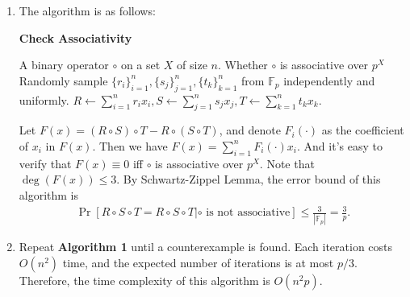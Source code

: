\begin{answer}
	\begin{enumerate}[label=\alph*).]
		\item The algorithm is as follows:
		\begin{algo}
			\caption{\textbf{Check Associativity}}
			\begin{algorithmic}[1]
				\Require A binary operator $\circ$ on a set $X$ of size $n$.
				\Ensure Whether $\circ$ is associative over $p^X$
				\State Randomly sample $\{r_i\}_{i=1}^n, \{s_j\}_{j=1}^n, \{t_k\}_{k=1}^n$ from $\mathbb{F}_p$ independently and uniformly.
				\State $R \leftarrow \sum_{i=1}^{n}r_ix_i, S \leftarrow \sum_{j=1}^{n}s_jx_j, T \leftarrow \sum_{k=1}^{n}t_kx_k$.
					\State \Return {}
				\Else 
					\State \Return {}
				\EndIf
			\end{algorithmic}
		\end{algo}
		Let $F(x) = (R\circ S)\circ T - R\circ(S\circ T)$, and denote $F_i(\cdot)$ as the coefficient of $x_i$ in $F(x)$. Then we have
			$F(x) = \sum_{i=1}^{n}F_i(\cdot)x_i. $
		And it's easy to verify that $F(x) \equiv 0$ iff $\circ$ is associative over $p^X$. Note that $\deg(F(x)) \le 3$. 
		By Schwartz-Zippel Lemma, the error bound of this algorithm is 
		\begin{align*}
			\Pr[R\circ S\circ T = R\circ S\circ T|\text{$\circ$ is not associative}] \le \frac{3}{|\mathbb{F}_p|} = \frac{3}{p}.
		\end{align*}
		\item Repeat \textbf{Algorithm 1} until a counterexample is found. Each iteration costs $O(n^2)$ time, and the expected number of iterations is at most $p/3$. Therefore, the time complexity of this algorithm is $O(n^2p)$.
	\end{enumerate}
	\ed
\end{answer}